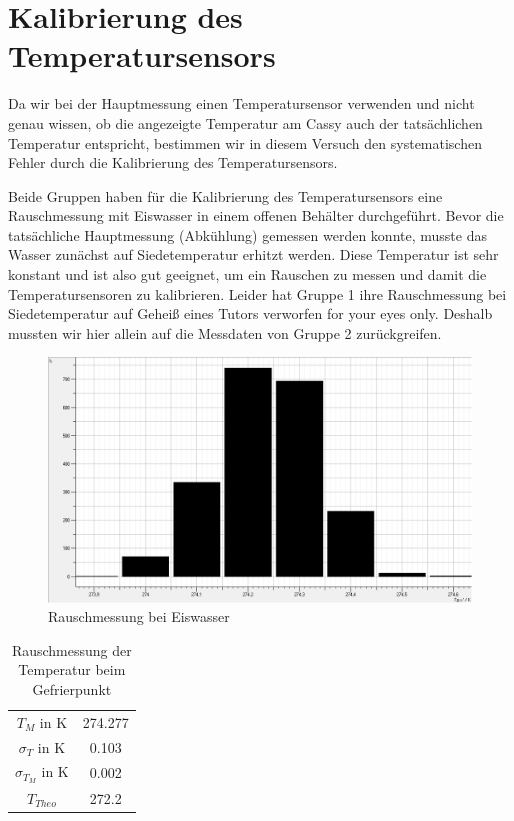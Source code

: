 \documentclass[12pt,a4paper]{article}
\author{Gruppe C14 \\ Julián Häck, Martin Koytek, Lars Wenning, Erik Zimmermann}
\begin{document}
\section{Kalibrierung des Temperatursensors}
Da wir bei der Hauptmessung einen Temperatursensor verwenden und nicht genau wissen, ob die angezeigte Temperatur am Cassy auch der tatsächlichen Temperatur entspricht, bestimmen wir in diesem Versuch den systematischen Fehler durch die Kalibrierung des Temperatursensors.

Beide Gruppen haben für die Kalibrierung des Temperatursensors  eine Rauschmessung mit Eiswasser in einem offenen Behälter durchgeführt. \newline
Bevor die tatsächliche Hauptmessung (Abkühlung) gemessen werden konnte, musste das Wasser zunächst auf Siedetemperatur erhitzt werden. Diese Temperatur ist sehr konstant und ist also gut geeignet, um ein Rauschen zu messen und damit die Temperatursensoren zu kalibrieren. \newline
Leider hat Gruppe 1 ihre Rauschmessung bei Siedetemperatur auf Geheiß eines Tutors verworfen \glqq for your eyes only\grqq.
Deshalb mussten wir hier allein auf die Messdaten von Gruppe 2 zurückgreifen.

\begin{figure}[hbtp]
\centering
\includegraphics[scale=0.5]{Bilder/Kalibration_Eiswasser.png}
\caption{Rauschmessung bei Eiswasser}
\end{figure}

\begin{table}[H]\centering
\caption{Rauschmessung der Temperatur beim Gefrierpunkt}
\begin{tabular}{c|c}
$T_M$ in K & 274.277  \\ 
$\sigma_T$ in K & 0.103  \\  
$\sigma_{T_M}$ in K & 0.002 \\  
$T_{Theo}$ & 272.2 \\
\end{tabular} 
\end{table}
\end{document}
